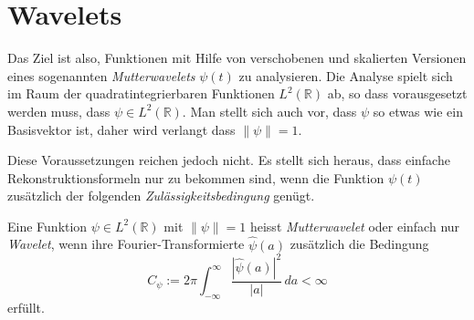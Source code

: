 %
%
%
\section{Wavelets}
Das Ziel ist also, Funktionen mit Hilfe von verschobenen und skalierten
Versionen eines sogenannten {\em Mutterwavelets} $\psi(t)$ zu analysieren.
Die Analyse spielt sich im Raum der quadratintegrierbaren Funktionen
$L^2(\mathbb R)$ ab, so dass vorausgesetzt werden muss,
dass $\psi\in L^2(\mathbb R)$.
Man stellt sich auch vor, dass $\psi$ so etwas wie ein Basisvektor ist,
daher wird verlangt dass $\|\psi\|=1$.

Diese Voraussetzungen reichen jedoch nicht.
Es stellt sich heraus, dass einfache Rekonstruktionsformeln nur zu
bekommen sind, wenn die Funktion $\psi(t)$ zusätzlich der folgenden
{\em Zulässigkeitsbedingung} genügt.
%

\begin{definition}
Eine Funktion $\psi\in L^2(\mathbb R)$ mit $\|\psi\|=1$ heisst 
{\em Mutterwavelet} oder einfach nur {\em Wavelet}, wenn ihre
Fourier-Transformierte $\hat{\psi}(a)$ zusätzlich die Bedingung
\begin{equation}
C_{\psi}
:=
2\pi
\int_{-\infty}^\infty \frac{|\hat{\psi}(a)|^2}{|a|}\,da < \infty
\label{cwt:zulaessig}
\end{equation}
erfüllt.
\end{definition}

